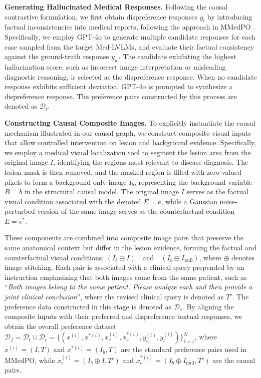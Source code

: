 \textbf{Generating Hallucinated Medical Responses.}
Following the causal contrastive formulation, we first obtain dispreference responses $\!y_l\!$ by introducing factual inconsistencies into medical reports, following the approach in MMedPO \cite{Zhu2025MMedPO}. Specifically, we employ GPT-4o \cite{achiam2023gpt} to generate multiple candidate responses for each case sampled from the target Med-LVLMs, and evaluate their factual consistency against the ground-truth response $y_w$. The candidate exhibiting the highest hallucination score, such as incorrect image interpretation or misleading diagnostic reasoning, is selected as the dispreference response. When no candidate response exhibits sufficient deviation, GPT-4o is prompted to synthesize a dispreference response. The preference pairs constructed by this process are denoted as $\mathcal{D}_t$.


\textbf{Constructing Causal Composite Images.}
To explicitly instantiate the causal mechanism illustrated in our causal graph, we construct composite visual inputs that allow controlled intervention on lesion and background evidence. Specifically, we employ a medical visual localization tool to segment the lesion area from the original image $I$, identifying the regions most relevant to disease diagnosis. The lesion mask is then removed, and the masked region is filled with zero-valued pixels to form a background-only image $I_b$, representing the background variable $B{=}b$ in the structural causal model. The original image $I$ serves as the factual visual condition associated with the denoted $E{=}e$, while a Gaussian noise-perturbed version of the same image serves as the counterfactual condition $E{=}e^*$.

These components are combined into composite image pairs that preserve the same anatomical context but differ in the lesion evidence, forming the factual and counterfactual visual conditions: $(I_b \oplus I) \quad \text{and} \quad (I_b \oplus I_{\text{null}})$, where $\oplus$ denotes image stitching. Each pair is associated with a clinical query prepended by an instruction emphasizing that both images come from the same patient, such as “\textit{Both images belong to the same patient. Please analyze each and then provide a joint clinical conclusion}”, where the revised clinical query is denoted as $T'$. The preference data constructed in this stage is denoted as $\mathcal{D}_c$. By aligning the composite inputs with their preferred and dispreference textual responses, we obtain the overall preference dataset $\mathcal{D}_f = \mathcal{D}_t \cup \mathcal{D}_c = 
\big\{(x^{(i)},x^{*(i)},x_c^{(i)},x_c^{*(i)},y_w^{(i)},y_l^{(i)})\big\}_{i=1}^N$,
where $x^{(i)}=(I,T)$ and $x^{*(i)}=(I_b,T)$ are the standard preference pairs used in MMedPO, while $x_c^{(i)}=(I_b\!\oplus\!I,T')$ and $x_c^{*(i)}=(I_b\!\oplus\!I_{\text{null}},T')$ are the causal pairs.

